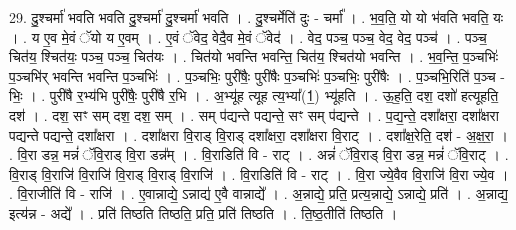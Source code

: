 \documentclass[17pt]{extarticle}
\begin{document}
29. दु॒श्चर्मा॑ भवति भवति दु॒श्चर्मा॑ दु॒श्चर्मा॑ भवति । . दु॒श्चर्मेति॑ दुः - चर्मा᳚ । . भ॒व॒ति॒ यो यो भ॑वति भवति॒ यः । . य ए॒व मे॒वं ॅयो य ए॒वम् । . ए॒वं ॅवेद॒ वेदै॒व मे॒वं ॅवेद॑ । . वेद॒ पञ्च॒ पञ्च॒ वेद॒ वेद॒ पञ्च॑ । . पञ्च॒ चित॑य॒ श्चित॑यः॒ पञ्च॒ पञ्च॒ चित॑यः । . चित॑यो भवन्ति भवन्ति॒ चित॑य॒ श्चित॑यो भवन्ति । . भ॒व॒न्ति॒ प॒ञ्चभिः॑ प॒ञ्चभि॑र् भवन्ति भवन्ति प॒ञ्चभिः॑ । . प॒ञ्चभिः॒ पुरी॑षैः॒ पुरी॑षैः प॒ञ्चभिः॑ प॒ञ्चभिः॒ पुरी॑षैः । . प॒ञ्चभि॒रिति॑ प॒ञ्च - भिः॒ । . पुरी॑षै र॒भ्य॑भि पुरी॑षैः॒ पुरी॑षै र॒भि । . अ॒भ्यू॑ह त्यूह त्य॒भ्या᳚(1॒) भ्यू॑हति । . ऊ॒ह॒ति॒ दश॒ दशो॑ हत्यूहति॒ दश॑ । . दश॒ सꣳ सम् दश॒ दश॒ सम् । . सम् प॑द्यन्ते पद्यन्ते॒ सꣳ सम् प॑द्यन्ते । . प॒द्य॒न्ते॒ दशा᳚क्षरा॒ दशा᳚क्षरा पद्यन्ते पद्यन्ते॒ दशा᳚क्षरा । . दशा᳚क्षरा वि॒राड् वि॒राड् दशा᳚क्षरा॒ दशा᳚क्षरा वि॒राट् । . दशा᳚क्ष॒रेति॒ दश॑ - अ॒क्ष॒रा॒ । . वि॒रा डन्न॒ मन्नं॑ ॅवि॒राड् वि॒रा डन्न᳚म् । . वि॒राडिति॑ वि - राट् । . अन्नं॑ ॅवि॒राड् वि॒रा डन्न॒ मन्नं॑ ॅवि॒राट् । . वि॒राड् वि॒राजि॑ वि॒राजि॑ वि॒राड् वि॒राड् वि॒राजि॑ । . वि॒राडिति॑ वि - राट् । . वि॒रा ज्ये॒वैव वि॒राजि॑ वि॒रा ज्ये॒व । . वि॒राजीति॑ वि - राजि॑ । . ए॒वान्नाद्ये॒ ऽन्नाद्य॑ ए॒वै वान्नाद्ये᳚ । . अ॒न्नाद्ये॒ प्रति॒ प्रत्य॒न्नाद्ये॒ ऽन्नाद्ये॒ प्रति॑ । . अ॒न्नाद्य॒ इत्य॑न्न - अद्ये᳚ । . प्रति॑ तिष्ठति तिष्ठति॒ प्रति॒ प्रति॑ तिष्ठति । . ति॒ष्ठ॒तीति॑ तिष्ठति । \newline
\end{document}
